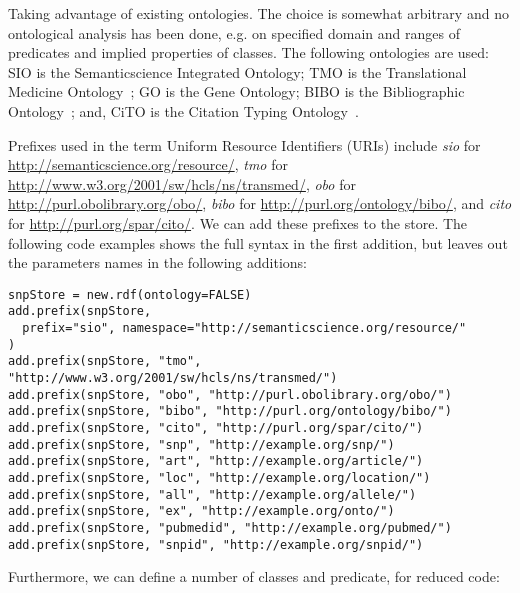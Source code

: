 \documentclass[12pt]{article}
\begin{document}
Taking advantage of existing ontologies. The choice is somewhat arbitrary and no ontological
analysis has been done, e.g. on specified domain and ranges of predicates and implied
properties of classes. The following ontologies are used:
SIO is the Semanticscience Integrated Ontology;
TMO is the Translational Medicine Ontology~\cite{Luciano2011};
GO is the Gene Ontology;
BIBO is the Bibliographic Ontology~\cite{d2009bibliographic}; and, 
CiTO is the Citation Typing Ontology~\cite{Shotton2010}.

Prefixes used in the term Uniform Resource Identifiers (URIs) include
\textit{sio} for \url{http://semanticscience.org/resource/},
\textit{tmo} for \url{http://www.w3.org/2001/sw/hcls/ns/transmed/},
\textit{obo} for \url{http://purl.obolibrary.org/obo/},
\textit{bibo} for \url{http://purl.org/ontology/bibo/}, and
\textit{cito} for \url{http://purl.org/spar/cito/}.
We can add these prefixes to the store. The following code examples
shows the full syntax in the first addition, but leaves out the
parameters names in the following additions:

\begin{footnotesize}
\begin{verbatim}
snpStore = new.rdf(ontology=FALSE)
add.prefix(snpStore,
  prefix="sio", namespace="http://semanticscience.org/resource/"
)
add.prefix(snpStore, "tmo", "http://www.w3.org/2001/sw/hcls/ns/transmed/")
add.prefix(snpStore, "obo", "http://purl.obolibrary.org/obo/")
add.prefix(snpStore, "bibo", "http://purl.org/ontology/bibo/")
add.prefix(snpStore, "cito", "http://purl.org/spar/cito/")
add.prefix(snpStore, "snp", "http://example.org/snp/")
add.prefix(snpStore, "art", "http://example.org/article/")
add.prefix(snpStore, "loc", "http://example.org/location/")
add.prefix(snpStore, "all", "http://example.org/allele/")
add.prefix(snpStore, "ex", "http://example.org/onto/")
add.prefix(snpStore, "pubmedid", "http://example.org/pubmed/")
add.prefix(snpStore, "snpid", "http://example.org/snpid/")
\end{verbatim}
\end{footnotesize}

Furthermore, we can define a number of classes and predicate, for reduced code:
\end{document}
